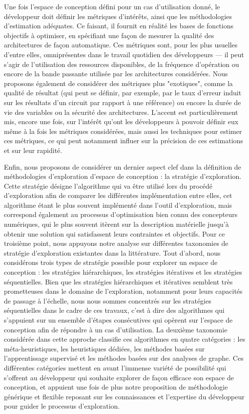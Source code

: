    Une fois l'espace de conception défini pour un cas d'utilisation donné, le développeur doit définir les métriques d'intérêts, ainsi que les méthodologies d'estimation adéquates.
    Ce faisant, il fournit en réalité les bases de fonctions objectifs à optimiser, en spécifiant une façon de mesurer la qualité des architectures de façon automatique.
    Ces métriques sont, pour les plus usuelles d'entre elles, omniprésentes dans le travail quotidien des développeurs --- il peut s'agir de l'utilisation des ressources disponibles, de la fréquence d'opération ou encore de la bande passante utilisée par les architectures considérées.
    Nous proposons également de considérer des métriques plus "exotiques", comme la qualité de résultat (qui peut se définir, par exemple, par le taux d'erreur induit sur les résultats d'un circuit par rapport à une référence) ou encore la durée de vie des variables ou la sécurité des architectures.
    L'accent est particulièrement mis, encore une fois, sur l'intérêt qu'ont les développeurs à pouvoir définir eux même à la fois les métriques considérées, mais aussi les techniques pour estimer ces métriques, ce qui peut notamment influer sur la précision de ces estimations et sur leur rapidité.

    Enfin, nous proposons de considérer un dernier aspect clef dans la définition de méthodologies d'exploration d'espace de conception : la stratégie d'exploration.
    Cette stratégie désigne l'algorithme qui va être utilisé lors du procédé d'exploration afin de comparer les différentes implémentation entre elles, cet algorithme étant le plus souvent implémenté dans l'outil d'exploration, mais correspond également au processus d'optimisation bien connu des concepteurs numériques, qui le plus souvent itèrent sur la description matérielle jusqu'à obtenir une solution qui satisfassent leurs contraintes et objectifs.
    Pour ce troisième point, nous appuyons notre analyse sur différentes taxonomies de stratégie d'exploration existantes dans la littérature.
    Tout d'abord, nous considérons trois types de stratégie possible pour explorer un espace de conception : les stratégies hiérarchiques, les stratégies itératives et les stratégies séquentielles.
    Bien que les stratégies hiérarchiques et itératives semblent très prometteuses dans le domaine de l'exploration, notamment pour leurs capacités de passage à l'échelle, nous nous sommes concentrés sur les stratégies séquentielles dans le cadre de ces travaux, c'est à dire des algorithmes qui s'appuient sur un ensemble d'étapes consécutives qui opèrent sur l'espace de conception afin de répondre à un cas d'utilisation.
    La deuxième taxonomie considérée dans cette approche classifie ces algorithmes en quatre catégories : les méta-heuristiques, les heuristiques dédiées, les méthodes basées sur l'apprentissage supervisé et les méthodes basées sur des analyses de graphe.
    Ces différentes catégories mettent en avant l'immense variété de possibilité qui s'offrent au développeur qui souhaite explorer de façon efficace son espace de conception, et appuient une fois de plus notre proposition de méthodologie générique et flexible reposant sur les connaissances et l'expertise du développeur pour guider le processus d'exploration.

